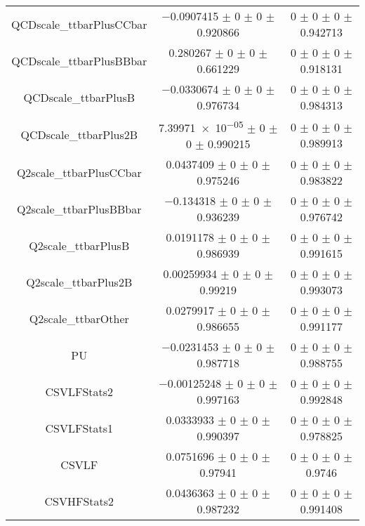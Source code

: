 \begin{table}
\begin{tabular}{ccc}
QCDscale\_ttbarPlusCCbar 	& \num{-0.0907415} $\pm$ \num{0} $\pm$ \num{0} $\pm$ \num{0.920866} 	& \num{0} $\pm$ \num{0} $\pm$ \num{0} $\pm$ \num{0.942713}\\
QCDscale\_ttbarPlusBBbar 	& \num{0.280267} $\pm$ \num{0} $\pm$ \num{0} $\pm$ \num{0.661229} 	& \num{0} $\pm$ \num{0} $\pm$ \num{0} $\pm$ \num{0.918131}\\
QCDscale\_ttbarPlusB 	& \num{-0.0330674} $\pm$ \num{0} $\pm$ \num{0} $\pm$ \num{0.976734} 	& \num{0} $\pm$ \num{0} $\pm$ \num{0} $\pm$ \num{0.984313}\\
QCDscale\_ttbarPlus2B 	& \num{7.39971e-05} $\pm$ \num{0} $\pm$ \num{0} $\pm$ \num{0.990215} 	& \num{0} $\pm$ \num{0} $\pm$ \num{0} $\pm$ \num{0.989913}\\
Q2scale\_ttbarPlusCCbar 	& \num{0.0437409} $\pm$ \num{0} $\pm$ \num{0} $\pm$ \num{0.975246} 	& \num{0} $\pm$ \num{0} $\pm$ \num{0} $\pm$ \num{0.983822}\\
Q2scale\_ttbarPlusBBbar 	& \num{-0.134318} $\pm$ \num{0} $\pm$ \num{0} $\pm$ \num{0.936239} 	& \num{0} $\pm$ \num{0} $\pm$ \num{0} $\pm$ \num{0.976742}\\
Q2scale\_ttbarPlusB 	& \num{0.0191178} $\pm$ \num{0} $\pm$ \num{0} $\pm$ \num{0.986939} 	& \num{0} $\pm$ \num{0} $\pm$ \num{0} $\pm$ \num{0.991615}\\
Q2scale\_ttbarPlus2B 	& \num{0.00259934} $\pm$ \num{0} $\pm$ \num{0} $\pm$ \num{0.99219} 	& \num{0} $\pm$ \num{0} $\pm$ \num{0} $\pm$ \num{0.993073}\\
Q2scale\_ttbarOther 	& \num{0.0279917} $\pm$ \num{0} $\pm$ \num{0} $\pm$ \num{0.986655} 	& \num{0} $\pm$ \num{0} $\pm$ \num{0} $\pm$ \num{0.991177}\\
PU 	& \num{-0.0231453} $\pm$ \num{0} $\pm$ \num{0} $\pm$ \num{0.987718} 	& \num{0} $\pm$ \num{0} $\pm$ \num{0} $\pm$ \num{0.988755}\\
CSVLFStats2 	& \num{-0.00125248} $\pm$ \num{0} $\pm$ \num{0} $\pm$ \num{0.997163} 	& \num{0} $\pm$ \num{0} $\pm$ \num{0} $\pm$ \num{0.992848}\\
CSVLFStats1 	& \num{0.0333933} $\pm$ \num{0} $\pm$ \num{0} $\pm$ \num{0.990397} 	& \num{0} $\pm$ \num{0} $\pm$ \num{0} $\pm$ \num{0.978825}\\
CSVLF 	& \num{0.0751696} $\pm$ \num{0} $\pm$ \num{0} $\pm$ \num{0.97941} 	& \num{0} $\pm$ \num{0} $\pm$ \num{0} $\pm$ \num{0.9746}\\
CSVHFStats2 	& \num{0.0436363} $\pm$ \num{0} $\pm$ \num{0} $\pm$ \num{0.987232} 	& \num{0} $\pm$ \num{0} $\pm$ \num{0} $\pm$ \num{0.991408}\\

\end{tabular}
\end{table}
